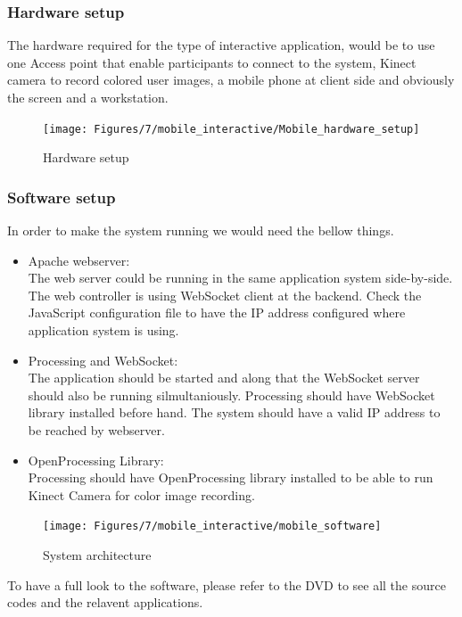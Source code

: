 \iffalse

\subsubsection{Hardware setup}
The hardware required for the type of interactive application, would be to use one Access point that enable participants to connect to the system, Kinect camera to record colored user images, a mobile phone at client side and obviously the screen and a workstation.


\begin{figure}[H]
    \centering
    \texttt{[image: Figures/7/mobile\_interactive/Mobile\_hardware\_setup]}
    \caption{Hardware setup}%
    \label{fig:mobile_hardware_setup}%
\end{figure}


\subsubsection{Software setup}
In order to make the system running we would need the bellow things.
\begin{itemize}
\item Apache webserver:\\
The web server could be running in the same application system side-by-side. The web controller is using WebSocket client at the backend. Check the JavaScript configuration
file to have the IP address configured where application system is using.
\item Processing and WebSocket:\\
The application should be started and along that the WebSocket server should also be running silmultaniously. Processing should have WebSocket library installed before hand. The system should have a valid IP address to be reached by webserver.
\item OpenProcessing Library:\\
Processing should have OpenProcessing library installed to be able to run Kinect Camera for color image recording.
\end{itemize}


\begin{figure}[H]
    \centering
    \texttt{[image: Figures/7/mobile\_interactive/mobile\_software]}
    \caption{System architecture}%
    \label{fig:mobile_software_setup}%
\end{figure}

To have a full look to the software, please refer to the DVD to see all the source codes and the relavent applications.

